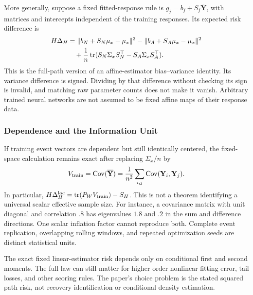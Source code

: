 More generally, suppose a fixed fitted-response rule is $\widehat g_j=b_j+S_j\overline{\mathbf Y}$, with matrices and intercepts independent of the training responses. Its expected risk difference is
\begin{align*}
 H\Delta_H
 &=\|b_N+S_N\mu_x-\mu_x\|^2
   -\|b_A+S_A\mu_x-\mu_x\|^2\\
 &\quad+\frac1n\operatorname{tr}(S_N\Sigma_xS_N^\top-S_A\Sigma_xS_A^\top).
\end{align*}
This is the full-path version of an affine-estimator bias--variance identity. Its variance difference is signed. Dividing by that difference without checking its sign is invalid, and matching raw parameter counts does not make it vanish. Arbitrary trained neural networks are not assumed to be fixed affine maps of their response data.

\subsubsection{Dependence and the Information Unit}
If training event vectors are dependent but still identically centered, the fixed-space calculation remains exact after replacing $\Sigma_x/n$ by
\[
 V_{\rm train}=\operatorname{Cov}(\overline{\mathbf Y})
 =\frac1{n^2}\sum_{i,j}\operatorname{Cov}(\mathbf Y_i,\mathbf Y_j).
\]
In particular, $H\Delta_H^{\rm loc}=\operatorname{tr}(P_WV_{\rm train})-S_H$. This is not a theorem identifying a universal scalar effective sample size. For instance, a covariance matrix with unit diagonal and correlation $.8$ has eigenvalues $1.8$ and $.2$ in the sum and difference directions. One scalar inflation factor cannot reproduce both. Complete event replication, overlapping rolling windows, and repeated optimization seeds are distinct statistical units.

The exact fixed linear-estimator risk depends only on conditional first and second moments. The full law can still matter for higher-order nonlinear fitting error, tail losses, and other scoring rules. The paper's choice problem is the stated squared path risk, not recovery identification or conditional density estimation.

